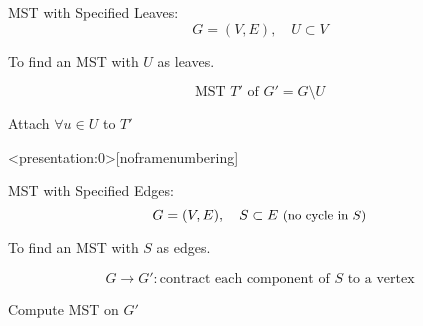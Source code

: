 \begin{frame}
  \begin{exampleblock}{MST with Specified Leaves: }
    \[
      G = (V, E), \quad U \subset V
    \]

    \centerline{To find an MST with $U$ as leaves.}
  \end{exampleblock}

  \pause

  \pause
  \vspace{-0.30cm}
  \[
    \text{MST } T' \text{ of } G' = G \setminus U
  \]

  \pause
  \centerline{Attach $\forall u \in U$ to $T'$ {}}
\end{frame}

\begin{frame}<presentation:0>[noframenumbering]
  \begin{block}{MST with Specified Edges: }
    \[
      G = (V,E),\quad S \subset E \text{ \small (no cycle in $S$)}
    \]
    
    \centerline{To find an MST with $S$ as edges.}
  \end{block}

  \pause
  \[
    G \to G': \text{contract each component of $S$ to a vertex}
  \]

  \pause
  \centerline{Compute MST on $G'$}
\end{frame}
